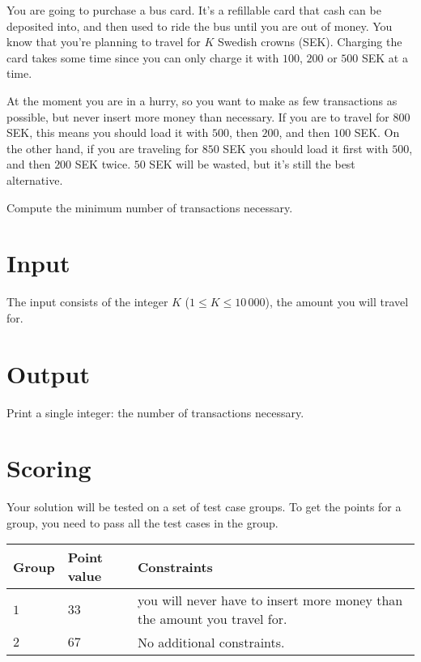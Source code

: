 You are going to purchase a bus card.
It's a refillable card that cash can be deposited into, and then used to ride the bus until you are out of money.
You know that you're planning to travel for $K$ Swedish crowns (SEK).
Charging the card takes some time since you can only charge it with $100$, $200$ or $500$ SEK at a time.

At the moment you are in a hurry, so you want to make as few transactions as possible, but never insert more money than necessary.
If you are to travel for $800$ SEK, this means you should load it with $500$, then $200$, and then $100$ SEK.
On the other hand, if you are traveling for $850$ SEK you should load it first with $500$, and then $200$ SEK twice.
$50$ SEK will be wasted, but it's still the best alternative.

Compute the minimum number of transactions necessary.

\section*{Input}
The input consists of the integer $K$ ($1 \le K \le 10\,000$), the amount you will travel for.

\section*{Output}
Print a single integer: the number of transactions necessary.

\section*{Scoring}
Your solution will be tested on a set of test case groups.
To get the points for a group, you need to pass all the test cases in the group.

\noindent
\begin{tabular}{| l | l | p{10cm} |}
    \hline
    \textbf{Group} & \textbf{Point value} & \textbf{Constraints} \\ \hline
    $1$    & $33$        & you will never have to insert more money than the amount you travel for. \\ \hline 
    $2$    & $67$        & No additional constraints. \\ \hline
\end{tabular}
